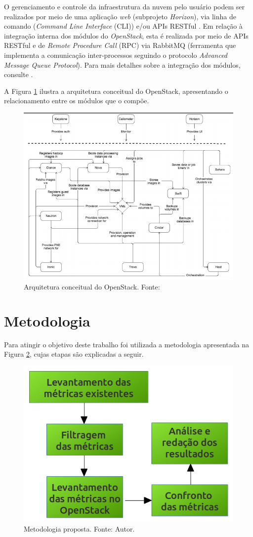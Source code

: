 \documentclass[conference]{IEEEtran}
\begin{document}
O gerenciamento e controle da infraestrutura da nuvem pelo usuário podem ser realizados por meio de uma aplicação \textit{web}
(subprojeto \textit{Horizon}), via linha de comando (\textit{Command Line Interface} (CLI)) e/ou APIs RESTful \cite{bui2016} \cite{openstack}.
Em relação à integração interna dos módulos do \textit{OpenStack}, esta é realizada por meio de APIs RESTful e 
de \textit{Remote Procedure Call} (RPC) via RabbitMQ (ferramenta que implementa a comunicação inter-processos seguindo o protocolo
\textit{Advanced Message Queue Protocol})\cite{bui2016}. Para mais detalhes sobre a integração dos módulos, consulte \cite{bui2016}.

A Figura \ref{fig:openstack_architecture} ilustra a arquitetura conceitual do OpenStack, apresentando o relacionamento entre os
módulos que o compõe.

\begin{figure}[ht]
\centering
\includegraphics[width=.5\textwidth]{figuras/openstack_architecture.png}
\caption{Arquitetura conceitual do OpenStack. Fonte: \cite{openstack}}
\label{fig:openstack_architecture}
\end{figure}

\section{Metodologia}

Para atingir o objetivo deste trabalho foi utilizada a metodologia apresentada na Figura \ref{metodologia},
cujas etapas são explicadas a seguir.


\begin{figure}[ht]
  \centering
  \includegraphics[width=.3\textwidth]{figuras/metodologia.png}
  \caption{Metodologia proposta. Fonte: Autor.}
  \label{metodologia}
\end{figure}
\end{document}

